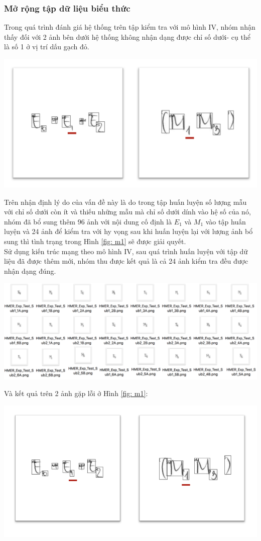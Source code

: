 \documentclass[a4paper]{article}
\theoremstyle{definition}
\begin{document}
	\subsubsection{Mở rộng tập dữ liệu biểu thức}
	Trong quá trình đánh giá hệ thống trên tập kiểm tra với mô hình IV, nhóm nhận thấy đối với 2 ảnh bên dưới hệ thống không nhận dạng được chỉ số dưới- cụ thể là số 1 ở vị trí dấu gạch đỏ. 
	\begin{center}
		\centering
		\includegraphics[width=0.6\linewidth]{M1E1}
		\vspace{0.5cm}
		\label{fig: m1}
	\end{center}
	Trên nhận định lý do của vấn đề này là do trong tập huấn luyện số lượng mẫu với chỉ số dưới còn ít và thiếu những mẫu mà chỉ số dưới dính vào hệ số của nó, nhóm đã bổ sung thêm 96 ảnh với nội dung cố định là $E_1$ và $M_1$ vào tập huấn luyện và 24 ảnh để kiểm tra với hy vọng sau khi huấn luyện lại với lượng ảnh bổ sung thì tình trạng trong Hình \ref{fig: m1} sẽ được giải quyết.\\
	Sử dụng kiến trúc mạng theo mô hình IV, sau quá trình huấn luyện với tập dữ liệu đã được thêm mới, nhóm thu được kết quả là cả 24 ảnh kiểm tra đều được nhận dạng đúng.
	\vspace{1cm}
	\begin{center}
		\centering
		\includegraphics[width=0.7\linewidth]{subfolder}
		\vspace{0.5cm}
	\end{center}
	Và kết quả trên 2 ảnh gặp lỗi ở Hình \ref{fig: m1}:
	\begin{center}
		\centering
		\includegraphics[width=0.7\linewidth]{M1E1_res}
		\vspace{0.5cm}
	\end{center}
\end{document}
